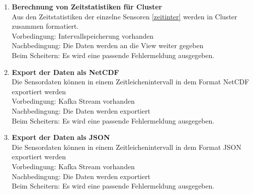 \begin{enumerate}[label=\textbf{PF\arabic{enumi}0}]
	\item \textbf{Berechnung von Zeitstatistiken für Cluster } \label{stat} \\
		Aus den Zeitstatistiken der einzelne Sensoren \ref{zeitinter} werden in Cluster zusammen formatiert.\\
		Vorbedingung: Intervallspeicherung vorhanden\\
		Nachbedingung: Die Daten werden an die View weiter gegeben  \\ 
		Beim Scheitern: Es wird eine passende Fehlermeldung ausgegeben.
	
	
	\item \textbf{Export der Daten als NetCDF } \label{netcdf}\\
		Die Sensordaten können in einem Zeitleichenintervall in dem Format NetCDF exportiert werden \\
		Vorbedingung: Kafka Stream vorhanden \\
		Nachbedingung: Die Daten werden exportiert \\ 
		Beim Scheitern: Es wird eine passende Fehlermeldung ausgegeben.
	
	\item \textbf{Export der Daten als JSON } \label{json}\\
		Die Sensordaten können in einem Zeitleichenintervall in dem Format JSON exportiert werden \\
		Vorbedingung: Kafka Stream vorhanden \\
		Nachbedingung: Die Daten werden exportiert \\ 
		Beim Scheitern: Es wird eine passende Fehlermeldung ausgegeben.
		
	
	 	
	 

\end{enumerate}
